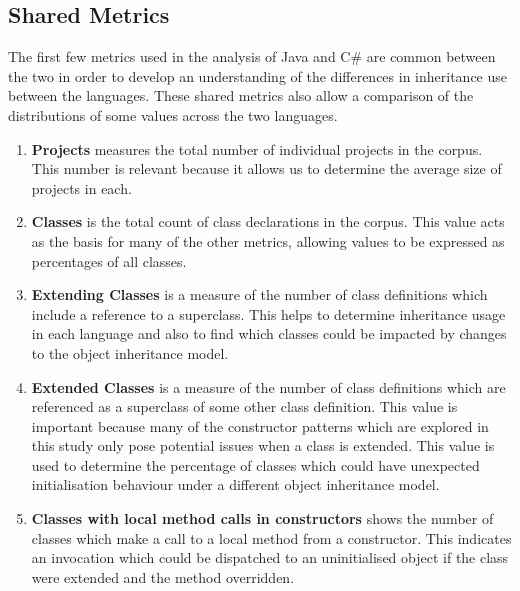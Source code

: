 \subsection{Shared Metrics}
The first few metrics used in the analysis of Java and C\# are common between the two in order to develop an understanding of the differences in inheritance use between the languages. These shared metrics also allow a comparison of the distributions of some values across the two languages.
\begin{enumerate}
	\item \textbf{Projects} measures the total number of individual projects in the corpus. This number is relevant because it allows us to determine the average size of projects in each.
	\item \textbf{Classes} is the total count of class declarations in the corpus. This value acts as the basis for many of the other metrics, allowing values to be expressed as percentages of all classes.
	\item \textbf{Extending Classes} is a measure of the number of class definitions which include a reference to a superclass. This helps to determine inheritance usage in each language and also to find which classes could be impacted by changes to the object inheritance model.
	\item \textbf{Extended Classes} is a measure of the number of class definitions which are referenced as a superclass of some other class definition. This value is important because many of the constructor patterns which are explored in this study only pose potential issues when a class is extended. This value is used to determine the percentage of classes which could have unexpected initialisation behaviour under a different object inheritance model.
	
	\item \textbf{Classes with local method calls in constructors} shows the number of classes which make a call to a local method from a constructor. This indicates an invocation which could be dispatched to an uninitialised object if the class were extended and the method overridden.
\end{enumerate}

